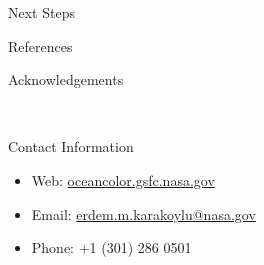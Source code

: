\documentclass[final]{beamer}
\newlength{\onecolwid}
\begin{document}
\begin{frame}[t]
\begin{columns}[t]
\begin{column}{\onecolwid}
\begin{block}{Next Steps}
\end{block}



\begin{block}{References}
\nocite{} %
\small{
\vspace{0.75in}}

\end{block}



\begin{block}{Acknowledgements}

\small{} \\

\end{block}



\begin{alertblock}{Contact Information}

\begin{itemize}
\item Web: \href{oceancolor.gsfc.nasa.gov}{oceancolor.gsfc.nasa.gov}
\item Email: \href{mailto:erdem.m.karakoylu@nasa.gov}{erdem.m.karakoylu@nasa.gov}
\item Phone: +1 (301) 286 0501
\end{itemize}


\end{alertblock}
\end{column}
\end{columns}
\end{frame}
\end{document}
